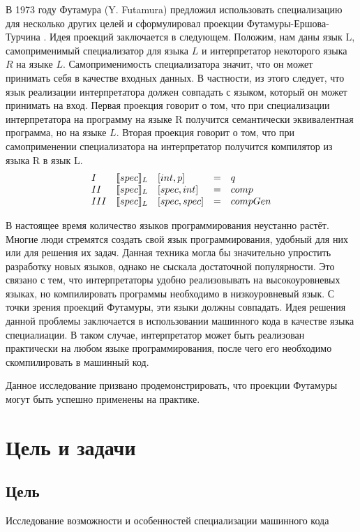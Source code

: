 В 1973 году Футамура (Y. Futamura) предложил использовать специализацию для несколько других целей и сформулировал проекции Футамуры-Ершова-Турчина \cite{Futa}. Идея проекций заключается в следующем. Положим, нам даны язык L, самоприменимый специализатор для языка $L$ и интерпретатор некоторого языка $R$ на языке $L$. Самоприменимость специализатора значит, что он может принимать себя в качестве входных данных. В частности, из этого следует, что язык реализации интерпретатора должен совпадать с языком, который он может принимать на вход. Первая проекция говорит о том, что при специализации интерпретатора на программу на языке R получится семантически эквивалентная программа, но на языке $L$. Вторая проекция говорит о том, что при самоприменении специализатора на интерпретатор получится компилятор из языка R в язык L.
    $$
    \begin{array}{l l l c l}
      I & \llbracket spec \rrbracket_L &[int, p] &= &q\\
      II & \llbracket spec \rrbracket_L &[spec, int] &= &comp\\
      III & \llbracket spec \rrbracket_L &[spec, spec] &= &compGen
    \end{array}$$  

В настоящее время количество языков программирования неустанно растёт. Многие люди стремятся создать свой язык программирования, удобный для них или для решения их задач. Данная техника могла бы значительно упростить разработку новых языков, однако не сыскала достаточной популярности. Это связано с тем, что интерпретаторы удобно реализовывать на высокоуровневых языках, но компилировать программы необходимо в низкоуровневый язык. С точки зрения проекций Футамуры, эти языки должны совпадать. Идея решения данной проблемы заключается в использовании машинного кода в качестве языка специалиации. В таком случае, интерпретатор может быть реализован практически на любом языке  программирования, после чего его необходимо скомпилировать в машинный код.

Данное исследование призвано продемонстрировать, что проекции Футамуры могут быть успешно применены на практике.

\section{Цель и задачи}

\subsection*{Цель}
Исследование возможности и особенностей специализации машинного кода

